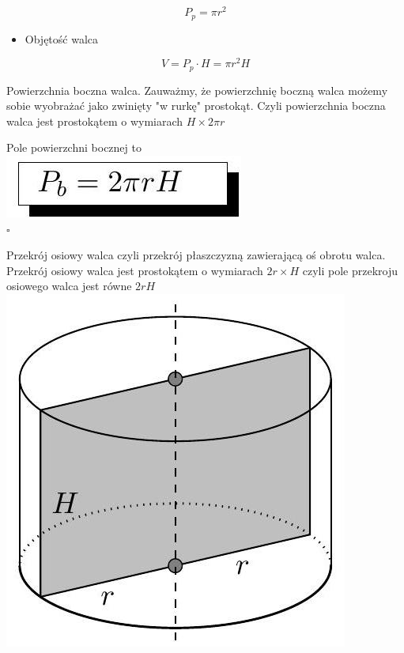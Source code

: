 \documentclass[10pt]{article}
\begin{document}
\[
P_{p}=\pi r^{2}
\]

\begin{itemize}
  \item Objętość walca
\end{itemize}

\[
V=P_{p} \cdot H=\pi r^{2} H
\]

Powierzchnia boczna walca. Zauważmy, że powierzchnię boczną walca możemy sobie wyobrażać jako zwinięty "w rurkę" prostokąt. Czyli powierzchnia boczna walca jest prostokątem o wymiarach \(H \times 2 \pi r\)

Pole powierzchni bocznej to\\
\includegraphics[max width=\textwidth, center]{2024_11_21_e9b4faa005d5be2cc318g-095}\\
\(\square\)

Przekrój osiowy walca czyli przekrój płaszczyzną zawierającą oś obrotu walca. Przekrój osiowy walca jest prostokątem o wymiarach \(2 r \times H\) czyli pole przekroju osiowego walca jest równe \(2 r H\)\\
\includegraphics[max width=\textwidth, center]{2024_11_21_e9b4faa005d5be2cc318g-095(1)}
\end{document}
